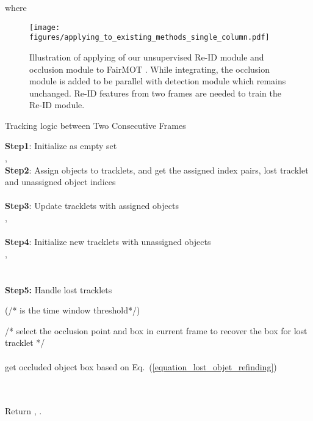 \documentclass[final,1p,times,twocolumn]{elsarticle}
\newcommand{\eref}[1]{Eq.~(\ref{#1})}
\begin{document}
	
	
	
	where 
	
	
	
	\begin{figure}[t]
		\centering
		\texttt{[image: figures/applying\_to\_existing\_methods\_single\_column.pdf]}
		\caption{
			Illustration of applying of our unsupervised Re-ID module and occlusion module to
			FairMOT \cite{zhang2020fairmot}.
			While integrating,
			the occlusion module is added to be parallel with detection module which remains unchanged. Re-ID features from two frames are needed to train the Re-ID module.
		}
		\label{figure_applying_to_existing_methods}
	\end{figure}
	
	
	\begin{algorithm}[tp]
		\footnotesize
		\caption{Tracking logic between Two Consecutive Frames}
		\label{algorithm_tracking_online}
		\textbf{Step1}: Initialize as empty set \\
		{\quad\quad ,  }\\
		\textbf{Step2}: Assign objects to tracklets, and get the assigned index pairs, lost tracklet and unassigned object indices \\
		\quad  \\
		\textbf{Step3}: Update tracklets with assigned objects\\
		\quad \For{}
		{
			,  \\
			  \\
			
		}
		\textbf{Step4}: Initialize new tracklets with unassigned objects \\
		\quad \For{}
		{
			,  \\
			 \\
			
			\quad \\ 
		}
		\textbf{Step5:} Handle lost tracklets  \\ 
		\quad\For{}
		{	
			\If(/* is the time window threshold*/){}
{
				
				/* select the occlusion point and box in current frame to recover the box for lost tracklet */ \\
				 \\ 
				\uIf{}
				{   
					 get occluded object box  based on \eref{equation_lost_objet_refinding}\\
					  \\
					 \\
}
				\Else{
					\\
					  \\
					
				}
			}
		}
		Return , .
	\end{algorithm}
\end{document}
